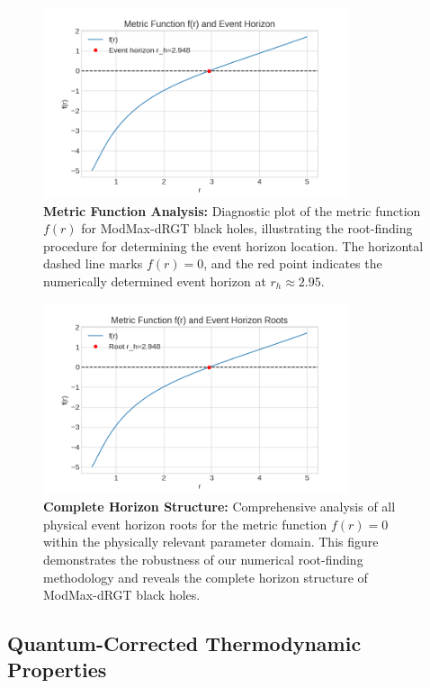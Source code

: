 \documentclass[12pt]{article}
\begin{document}
\begin{figure}[H]
    \centering
    \includegraphics[width=0.8\textwidth]{figures/figure_1.png}
    \caption{\textbf{Metric Function Analysis:} Diagnostic plot of the metric function $f(r)$ for ModMax-dRGT black holes, illustrating the root-finding procedure for determining the event horizon location. The horizontal dashed line marks $f(r) = 0$, and the red point indicates the numerically determined event horizon at $r_h \approx 2.95$.}
    \label{fig:notebook_fig1}
\end{figure}

\begin{figure}[H]
    \centering
    \includegraphics[width=0.8\textwidth]{figures/figure_2.png}
    \caption{\textbf{Complete Horizon Structure:} Comprehensive analysis of all physical event horizon roots for the metric function $f(r) = 0$ within the physically relevant parameter domain. This figure demonstrates the robustness of our numerical root-finding methodology and reveals the complete horizon structure of ModMax-dRGT black holes.}
    \label{fig:notebook_fig2}
\end{figure}

\subsection{Quantum-Corrected Thermodynamic Properties}
\end{document}
